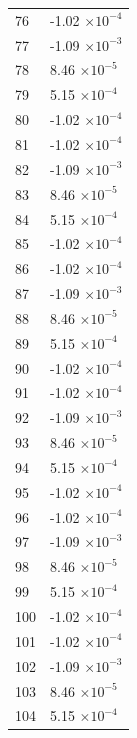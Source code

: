 \documentclass[a4paper,11pt]{article}
\begin{document}
\begin{center}
\begin{longtable}{|R{1.5cm}|R{2.5cm}|}
   76 &        -1.02 $\times 10^{          -4}$ \\
   77 &        -1.09 $\times 10^{          -3}$ \\
   78 &         8.46 $\times 10^{          -5}$ \\
   79 &         5.15 $\times 10^{          -4}$ \\
   80 &        -1.02 $\times 10^{          -4}$ \\
   81 &        -1.02 $\times 10^{          -4}$ \\
   82 &        -1.09 $\times 10^{          -3}$ \\
   83 &         8.46 $\times 10^{          -5}$ \\
   84 &         5.15 $\times 10^{          -4}$ \\
   85 &        -1.02 $\times 10^{          -4}$ \\
   86 &        -1.02 $\times 10^{          -4}$ \\
   87 &        -1.09 $\times 10^{          -3}$ \\
   88 &         8.46 $\times 10^{          -5}$ \\
   89 &         5.15 $\times 10^{          -4}$ \\
   90 &        -1.02 $\times 10^{          -4}$ \\
   91 &        -1.02 $\times 10^{          -4}$ \\
   92 &        -1.09 $\times 10^{          -3}$ \\
   93 &         8.46 $\times 10^{          -5}$ \\
   94 &         5.15 $\times 10^{          -4}$ \\
   95 &        -1.02 $\times 10^{          -4}$ \\
   96 &        -1.02 $\times 10^{          -4}$ \\
   97 &        -1.09 $\times 10^{          -3}$ \\
   98 &         8.46 $\times 10^{          -5}$ \\
   99 &         5.15 $\times 10^{          -4}$ \\
  100 &        -1.02 $\times 10^{          -4}$ \\
  101 &        -1.02 $\times 10^{          -4}$ \\
  102 &        -1.09 $\times 10^{          -3}$ \\
  103 &         8.46 $\times 10^{          -5}$ \\
  104 &         5.15 $\times 10^{          -4}$ \\

\end{longtable}
\end{center}
\end{document}
